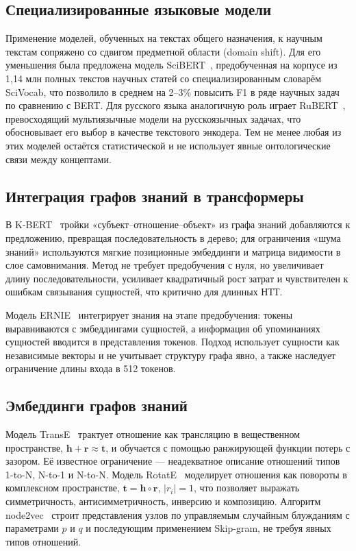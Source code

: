 \documentclass{misisarticle}
\begin{document}
\subsection{Специализированные языковые модели}
Применение моделей, обученных на текстах общего назначения, к научным текстам сопряжено со сдвигом предметной области (domain shift). Для его уменьшения была предложена модель SciBERT~\cite{scibert}, предобученная на корпусе из 1,14 млн полных текстов научных статей со специализированным словарём SciVocab, что позволило в среднем на 2--3\% повысить F1 в ряде научных задач по сравнению с BERT. Для русского языка аналогичную роль играет RuBERT~\cite{kuratov}, превосходящий мультиязычные модели на русскоязычных задачах, что обосновывает его выбор в качестве текстового энкодера. Тем не менее любая из этих моделей остаётся статистической и не использует явные онтологические связи между концептами.

\subsection{Интеграция графов знаний в трансформеры}
В K-BERT~\cite{kbert} тройки «субъект--отношение--объект» из графа знаний добавляются к предложению, превращая последовательность в дерево; для ограничения «шума знаний» используются мягкие позиционные эмбеддинги и матрица видимости в слое самовнимания. Метод не требует предобучения с нуля, но увеличивает длину последовательности, усиливает квадратичный рост затрат и чувствителен к ошибкам связывания сущностей, что критично для длинных НТТ.

Модель ERNIE~\cite{ernie} интегрирует знания на этапе предобучения: токены выравниваются с эмбеддингами сущностей, а информация об упоминаниях сущностей вводится в представления токенов. Подход использует сущности как независимые векторы и не учитывает структуру графа явно, а также наследует ограничение длины входа в 512 токенов.

\subsection{Эмбеддинги графов знаний}
Модель TransE~\cite{transe} трактует отношение как трансляцию в вещественном пространстве, $\mathbf{h}+\mathbf{r}\approx\mathbf{t}$, и обучается с помощью ранжирующей функции потерь с зазором. Её известное ограничение --- неадекватное описание отношений типов 1-to-N, N-to-1 и N-to-N. Модель RotatE~\cite{rotate} моделирует отношения как повороты в комплексном пространстве, $\mathbf{t}=\mathbf{h}\circ\mathbf{r}$, $|r_i|=1$, что позволяет выражать симметричность, антисимметричность, инверсию и композицию. Алгоритм node2vec~\cite{node2vec} строит представления узлов по управляемым случайным блужданиям с параметрами $p$ и $q$ и последующим применением Skip-gram, не требуя явных типов отношений.
\end{document}
